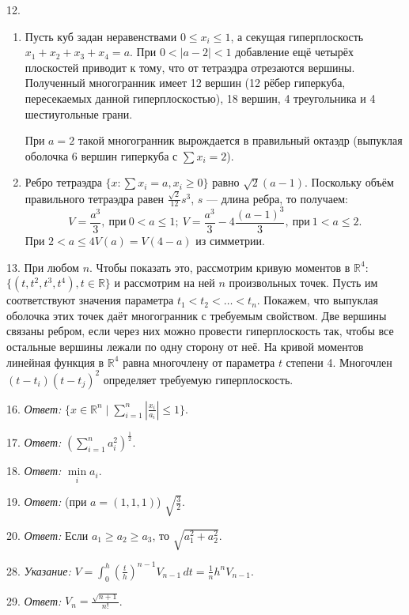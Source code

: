 	12. 
	\begin{enumerate}[label=\asbuk*)]
		\item Пусть куб задан неравенствами $0 \le x_i \le 1$, а секущая гиперплоскость $x_1 + x_2 + x_3 + x_4 = a$. При $0 < |a-2| < 1$ добавление ещё четырёх плоскостей приводит к тому, что от тетраэдра отрезаются вершины. Полученный многогранник имеет 12 вершин (12 рёбер гиперкуба, пересекаемых данной гиперплоскостью), 18 вершин, 4 треугольника и 4 шестиугольные грани.  

		При $a = 2$ такой многогранник вырождается в правильный октаэдр (выпуклая оболочка 6 вершин гиперкуба с $\sum x_i = 2$).

		\item Ребро тетраэдра $\{x : \sum x_i = a, x_i \ge 0\}$ равно $\sqrt{2}(a-1)$. Поскольку объём правильного тетраэдра равен $\frac{\sqrt{2}}{12}s^3$, $s$ — длина ребра, то получаем:  
		\[
			V = \frac{a^3}{3},\ \text{при}\ 0 < a \le 1;\
			V = \frac{a^3}{3} - 4\frac{(a-1)^3}{3},\ \text{при}\ 1 < a \le 2.
		\]  
		При $2 < a \le 4$\quad$V(a) = V(4-a)$ из симметрии.
	\end{enumerate}
	13. При любом $n$. Чтобы показать это, рассмотрим кривую моментов в $\mathbb{R}^4$: $\{(t,t^2,t^3,t^4), t \in \mathbb{R}\}$ и рассмотрим на ней $n$ произвольных точек. Пусть им соответствуют значения параметра $t_1 < t_2 < \dots < t_n$. Покажем, что выпуклая оболочка этих точек даёт многогранник с требуемым свойством. Две вершины связаны ребром, если через них можно провести гиперплоскость так, чтобы все остальные вершины лежали по одну сторону от неё. На кривой моментов линейная функция в $\mathbb{R}^4$ равна многочлену от параметра $t$ степени 4. Многочлен $(t-t_i)(t-t_j)^2$ определяет требуемую гиперплоскость.

	16. \textit{Ответ:} $\{ x \in \mathbb{R}^n \mid \sum\limits_{i=1}^n | \frac{x_i}{a_i} | \le 1 \}$.

	17. \textit{Ответ:} $\left( \sum\limits_{i=1}^n a_i^2 \right)^{\frac{1}{2}}$.

	18. \textit{Ответ:} $\min\limits_i a_i$.

	19. \textit{Ответ:} (при $a = (1,1,1)$) $\sqrt{\frac{3}{2}}$.

	20. \textit{Ответ:} Если $a_1 \ge a_2 \ge a_3$, то $\sqrt{a_1^2 + a_2^2}$.

	28. \textit{Указание:} $V = \int_0^h \left( \frac{t}{h} \right)^{n-1} V_{n-1}\, dt = \frac{1}{n} h^n V_{n-1}$.

	29. \textit{Ответ:} $V_n = \frac{\sqrt{n+1}}{n!}$.

